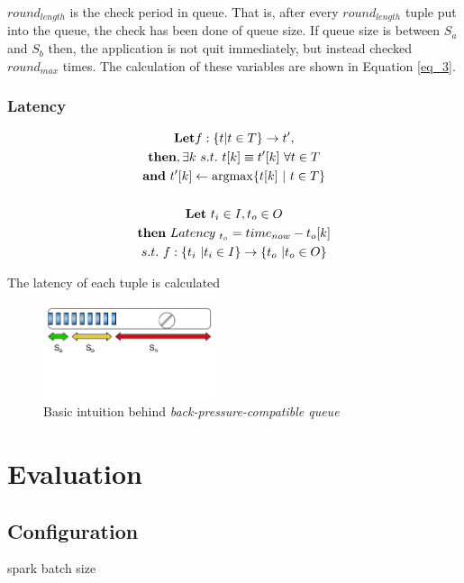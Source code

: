 \documentclass{vldb}
\begin{document}
$round_{length}$ is the check period in queue. That is, after every $round_{length}$ tuple put into the queue, the check has been done of queue size. If queue size is between $S_{a}$ and $S_{b}$ then, the application is not quit immediately, but instead checked $round_{max}$ times. The calculation of these variables are shown in Equation \ref{eq_3}.

\subsubsection{Latency}
\label{sec_latency}

\begin{equation}
  \begin{gathered}
\textbf{Let} f:\{t| t\in T \} \to t'  , \\
  \textbf{then}, \exists k \ s.t. \ t[k]  \equiv t'[k] \ \forall t \in T\\
  \textbf{and} \ t'[k] \gets \argmax\{t[k] \ | \ t \in T\}  \\
   \\
  \textbf{Let} \ t_{i} \in I , t_{o} \in O \\
\textbf{then} \ Latency_{ \ t_{o}} = time_{now} -  t_{o}[k] \\
s.t. \ f:\{t_{i} \ | t_{i} \in I \} \to \{t_{o} \ | t_{o} \in O \} 
  \end{gathered}\label{eq_1} 
\end{equation}

The latency of each tuple is calculated


\begin{figure}[h]
\centering
\includegraphics[width=0.45\textwidth]{queue}
\caption{Basic intuition behind \textit{back-pressure-compatible queue}}
\label{fig_queue}
\end{figure}


\section{Evaluation}
\subsection{Configuration}
spark batch size
\end{document}
